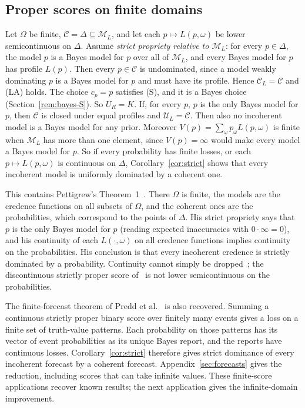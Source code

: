 \documentclass[11pt]{article}
\theoremstyle{definition}
\theoremstyle{remark}
\newcommand{\M}{\mathcal M}
\newcommand{\C}{\mathcal C}
\newcommand{\U}{\mathcal U}
\begin{document}
\subsection{Proper scores on finite domains}\label{sec:proper}
Let $\Omega$ be finite, $\C=\Delta\subseteq\M_L$, and let each $p\mapsto L(p,\omega)$ be lower semicontinuous on $\Delta$. Assume \emph{strict propriety relative to $\M_L$}: for every $p\in\Delta$, the model $p$ is a Bayes model for $p$ over all of $\M_L$, and every Bayes model for $p$ has profile $L(p)$. Then every $p\in\C$ is undominated, since a model weakly dominating $p$ is a Bayes model for $p$ and must have its profile. Hence $\C_L=\C$ and (LA) holds. The choice $c_p=p$ satisfies (S), and it is a Bayes choice (Section~\ref{rem:bayes-S}). So $U_R=K$. If, for every $p$, $p$ is the only Bayes model for $p$, then $\C$ is closed under equal profiles and $\U_L=\C$. Then also no incoherent model is a Bayes model for any prior. Moreover $V(p)=\sum_\omega p_\omega L(p,\omega)$ is finite when $\M_L$ has more than one element, since $V(p)=\infty$ would make every model a Bayes model for $p$. So if every probability has finite losses, or each $p\mapsto L(p,\omega)$ is continuous on $\Delta$, Corollary~\ref{cor:strict} shows that every incoherent model is uniformly dominated by a coherent one.

This contains Pettigrew's Theorem~1~\cite{Pettigrew}. There $\Omega$ is finite, the models are the credence functions on all subsets of $\Omega$, and the coherent ones are the probabilities, which correspond to the points of $\Delta$. His strict propriety says that $p$ is the only Bayes model for $p$ (reading expected inaccuracies with $0\cdot\infty=0$), and his continuity of each $L(\cdot,\omega)$ on all credence functions implies continuity on the probabilities. His conclusion is that every incoherent credence is strictly dominated by a probability. Continuity cannot simply be dropped~\cite{SSK09}; the discontinuous strictly proper score of~\cite[Example~4]{SSK09} is not lower semicontinuous on the probabilities.

The finite-forecast theorem of Predd et al.~\cite[Theorem~1]{Predd} is also recovered. Summing a continuous strictly proper binary score over finitely many events gives a loss on a finite set of truth-value patterns. Each probability on those patterns has its vector of event probabilities as its unique Bayes report, and the reports have continuous losses. Corollary~\ref{cor:strict} therefore gives strict dominance of every incoherent forecast by a coherent forecast. Appendix~\ref{sec:forecasts} gives the reduction, including scores that can take infinite values. These finite-score applications recover known results; the next application gives the infinite-domain improvement.
\end{document}
